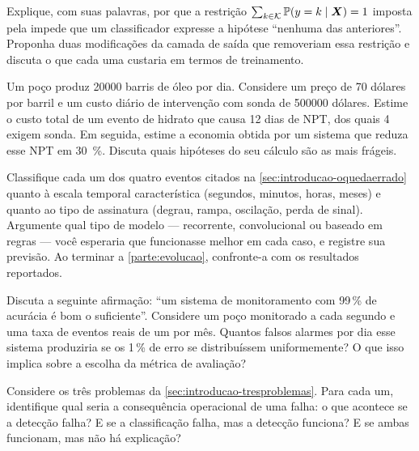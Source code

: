 \begin{exercicios}
\item Explique, com suas palavras, por que a restrição
      $\sum_{k \in \mathcal{K}} \mathbb{P}(y=k \mid \bm{X}) = 1$ imposta pela 
      impede que um classificador expresse a hipótese ``nenhuma das anteriores''.
      Proponha duas modificações da camada de saída que removeriam essa restrição e
      discuta o que cada uma custaria em termos de treinamento.

\item Um poço produz \num{20000} barris de óleo por dia. Considere um preço de
      \num{70} dólares por barril e um custo diário de intervenção com sonda de
      \num{500000} dólares. Estime o custo total de um evento de hidrato que causa
      \num{12} dias de NPT, dos quais \num{4} exigem sonda. Em seguida, estime a
      economia obtida por um sistema que reduza esse NPT em \SI{30}{\percent}. Discuta
      quais hipóteses do seu cálculo são as mais frágeis.

\item Classifique cada um dos quatro eventos citados na \cref{sec:introducao-oquedaerrado}
      quanto à escala temporal característica (segundos, minutos, horas, meses) e
      quanto ao tipo de assinatura (degrau, rampa, oscilação, perda de sinal).
      Argumente qual tipo de modelo --- recorrente, convolucional ou baseado em regras
      --- você esperaria que funcionasse melhor em cada caso, e registre sua previsão.
      Ao terminar a \cref{parte:evolucao}, confronte-a com os resultados reportados.

\item Discuta a seguinte afirmação: ``um sistema de monitoramento com 99\,\% de acurácia
      é bom o suficiente''. Considere um poço monitorado a cada segundo e uma taxa de
      eventos reais de um por mês. Quantos falsos alarmes por dia esse sistema
      produziria se os 1\,\% de erro se distribuíssem uniformemente? O que isso implica
      sobre a escolha da métrica de avaliação?

\item Considere os três problemas da \cref{sec:introducao-tresproblemas}. Para cada um,
      identifique qual seria a consequência operacional de uma falha: o que acontece se
      a detecção falha? E se a classificação falha, mas a detecção funciona? E se ambas
      funcionam, mas não há explicação?
\end{exercicios}

